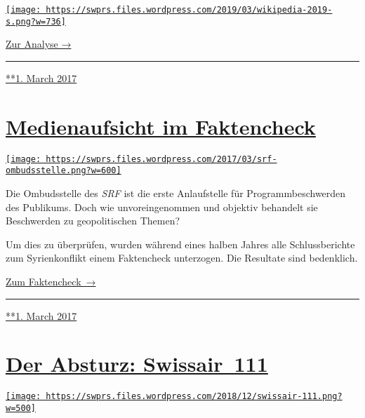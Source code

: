 \href{https://swprs.org/propaganda-in-der-wikipedia/}{\texttt{[image: https://swprs.files.wordpress.com/2019/03/wikipedia-2019-s.png?w=736]}}

\href{https://swprs.org/propaganda-in-der-wikipedia/}{Zur Analyse →}

\begin{center}\rule{0.5\linewidth}{\linethickness}\end{center}

\href{https://swprs.org/2017/03/01/propaganda-in-der-wikipedia/}{**1.
March 2017}

\hypertarget{medienaufsicht-im-faktencheck}{%
\section{\texorpdfstring{\href{https://swprs.org/2017/03/01/medienaufsicht-faktencheck/}{Medienaufsicht
im
Faktencheck}}{Medienaufsicht im Faktencheck}}\label{medienaufsicht-im-faktencheck}}

\href{https://swprs.org/2017/03/01/medienaufsicht-faktencheck/}{\texttt{[image: https://swprs.files.wordpress.com/2017/03/srf-ombudsstelle.png?w=600]}}

Die Ombudsstelle des \emph{SRF} ist die erste Anlaufstelle für
Programm­be­schwerden des Publi­kums. Doch wie un­vor­ein­ge­nommen und
objektiv behandelt sie Beschwerden zu geo­po­li­tischen Themen?

Um dies zu über­prüfen, wurden während eines halben Jahres alle
Schluss­be­richte zum Syrien­kon­flikt einem Fakten­check unter­zogen.
Die Resul­tate sind bedenk­lich.

\href{https://swprs.org/srf-ombudsstelle-im-faktencheck/}{Zum
Faktencheck~→}

\begin{center}\rule{0.5\linewidth}{\linethickness}\end{center}

\href{https://swprs.org/2017/03/01/medienaufsicht-faktencheck/}{**1.
March 2017}

\hypertarget{der-absturz-swissair-111}{%
\section{\texorpdfstring{\href{https://swprs.org/2017/03/01/der-absturz-swissair-111/}{Der
Absturz:
Swissair~111}}{Der Absturz: Swissair~111}}\label{der-absturz-swissair-111}}

\href{https://swprs.org/2017/03/01/der-absturz-swissair-111/}{\texttt{[image: https://swprs.files.wordpress.com/2018/12/swissair-111.png?w=500]}}

